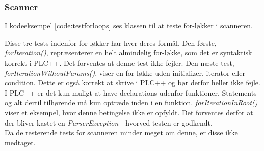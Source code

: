 \subsubsection{Scanner}

I kodeeksempel \ref{code:testforloops} ses klassen til at teste for-løkker i scanneren. 


\noindent Disse tre tests indenfor for-løkker har hver deres formål. Den første, \textit{forIteration()}, repræsenterer en helt almindelig for-løkke, som det er syntaktisk korrekt i PLC++. Det forventes at denne test ikke fejler.
Den næste test, \textit{forIterationWithoutParams()}, viser en for-løkke uden initializer, iterator eller condition. Dette er også korrekt at skrive i PLC++ og bør derfor heller ikke fejle. \\

\noindent I PLC++ er det kun muligt at have declarations udenfor funktioner. Statements og alt dertil tilhørende må kun optræde inden i en funktion. \textit{forIterationInRoot()} viser et eksempel, hvor denne betingelse ikke er opfyldt. Det forventes derfor at der bliver kastet en \textit{ParserException} - hvorved testen er godkendt.\\

\noindent Da de resterende tests for scanneren minder meget om denne, er disse ikke medtaget. 
